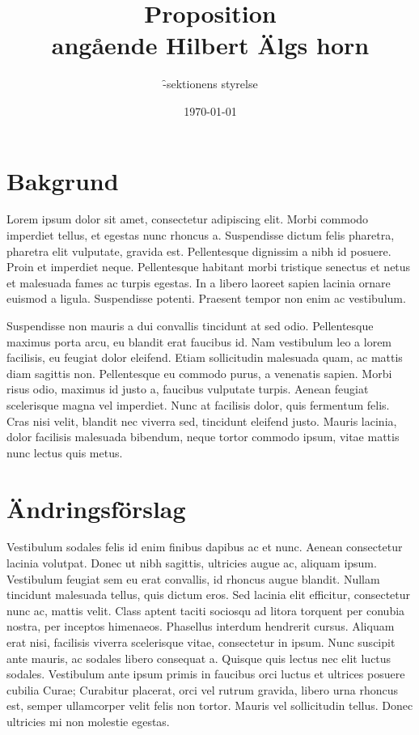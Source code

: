 \documentclass[proposition]{fclass}
\author{\f -sektionens styrelse}
\date{\today}
\title{Proposition \\
	\normalsize{angående Hilbert Älgs horn}} %
\begin{document}

\section*{Bakgrund} 

Lorem ipsum dolor sit amet, consectetur adipiscing elit. Morbi commodo imperdiet tellus, et egestas nunc rhoncus a. Suspendisse dictum felis pharetra, pharetra elit vulputate, gravida est. Pellentesque dignissim a nibh id posuere. Proin et imperdiet neque. Pellentesque habitant morbi tristique senectus et netus et malesuada fames ac turpis egestas. In a libero laoreet sapien lacinia ornare euismod a ligula. Suspendisse potenti. Praesent tempor non enim ac vestibulum.

Suspendisse non mauris a dui convallis tincidunt at sed odio. Pellentesque maximus porta arcu, eu blandit erat faucibus id. Nam vestibulum leo a lorem facilisis, eu feugiat dolor eleifend. Etiam sollicitudin malesuada quam, ac mattis diam sagittis non. Pellentesque eu commodo purus, a venenatis sapien. Morbi risus odio, maximus id justo a, faucibus vulputate turpis. Aenean feugiat scelerisque magna vel imperdiet. Nunc at facilisis dolor, quis fermentum felis. Cras nisi velit, blandit nec viverra sed, tincidunt eleifend justo. Mauris lacinia, dolor facilisis malesuada bibendum, neque tortor commodo ipsum, vitae mattis nunc lectus quis metus.

\section*{Ändringsförslag}

Vestibulum sodales felis id enim finibus dapibus ac et nunc. Aenean consectetur lacinia volutpat. Donec ut nibh sagittis, ultricies augue ac, aliquam ipsum. Vestibulum feugiat sem eu erat convallis, id rhoncus augue blandit. Nullam tincidunt malesuada tellus, quis dictum eros. Sed lacinia elit efficitur, consectetur nunc ac, mattis velit. Class aptent taciti sociosqu ad litora torquent per conubia nostra, per inceptos himenaeos. Phasellus interdum hendrerit cursus. Aliquam erat nisi, facilisis viverra scelerisque vitae, consectetur in ipsum. Nunc suscipit ante mauris, ac sodales libero consequat a. Quisque quis lectus nec elit luctus sodales. Vestibulum ante ipsum primis in faucibus orci luctus et ultrices posuere cubilia Curae; Curabitur placerat, orci vel rutrum gravida, libero urna rhoncus est, semper ullamcorper velit felis non tortor. Mauris vel sollicitudin tellus. Donec ultricies mi non molestie egestas.
\end{document}
